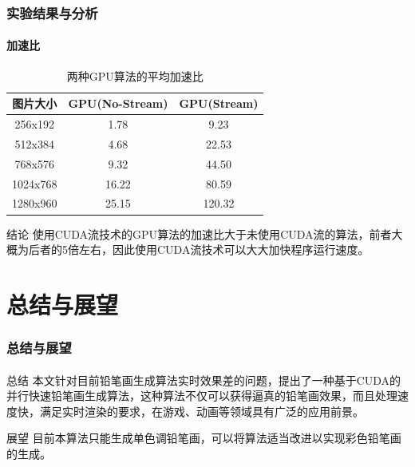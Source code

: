 \documentclass[aspectratio=43, xcolor=svgnames, t, 10pt]{beamer}
\begin{document}
\begin{frame}
  \frametitle{实验结果与分析}
  \framesubtitle{加速比}
  \begin{table}
    \centering
    \caption{两种GPU算法的平均加速比}
    \begin{tabular}{ccc}
      \toprule[1pt]
         图片大小 & \textrm{GPU(No-Stream)} & \textrm{GPU(Stream)}	\\
      \midrule
      256x192	&1.78&	9.23 \\
      512x384	&4.68&	22.53 \\
      768x576	&9.32&	44.50 \\
      1024x768 &	16.22&	80.59 \\
      1280x960	& 25.15&	120.32 \\
      \bottomrule[1pt]
    \end{tabular}
  \end{table}
  \begin{block}{结论}
    使用\textrm{CUDA}流技术的\textrm{GPU}算法的加速比大于未使用\textrm{CUDA}流的算法，前者大概为后者的5倍左右，因此使用\textrm{CUDA}流技术可以大大加快程序运行速度。
  \end{block}
\end{frame}

\section{总结与展望}
\begin{frame}
  \frametitle{总结与展望}
  \framesubtitle{}
  \begin{block}{总结}
    本文针对目前铅笔画生成算法实时效果差的问题，提出了一种基于CUDA的并行快速铅笔画生成算法，这种算法不仅可以获得逼真的铅笔画效果，而且处理速度快，满足实时渲染的要求，在游戏、动画等领域具有广泛的应用前景。
  \end{block}
  \begin{block}{展望}
    目前本算法只能生成单色调铅笔画，可以将算法适当改进以实现彩色铅笔画的生成。
  \end{block}
\end{frame}

{
  \begin{frame}
  \end{frame}
}
\end{document}
